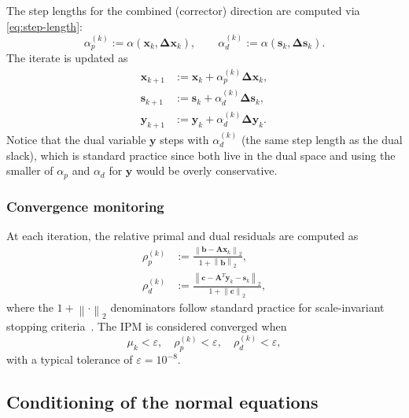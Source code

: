 \documentclass[11pt,twoside]{article}
\newcommand{\bA}{\mathbf{A}}
\newcommand{\bb}{\mathbf{b}}
\newcommand{\bc}{\mathbf{c}}
\newcommand{\bx}{\mathbf{x}}
\newcommand{\by}{\mathbf{y}}
\newcommand{\bs}{\mathbf{s}}
\newcommand{\bDelta}{\mathbf{\Delta}}
\newcommand{\norm}[1]{\left\lVert#1\right\rVert}
\begin{document}
The step lengths for the combined (corrector) direction are computed via
\eqref{eq:step-length}:
\begin{equation}
  \alpha_p^{(k)} := \alpha(\bx_k, \bDelta\bx_k),\qquad
  \alpha_d^{(k)} := \alpha(\bs_k, \bDelta\bs_k).
  \label{eq:step-lengths}
\end{equation}
The iterate is updated as
\begin{equation}
  \begin{aligned}
    \bx_{k+1} &:= \bx_k + \alpha_p^{(k)} \bDelta\bx_k, \\
    \bs_{k+1} &:= \bs_k + \alpha_d^{(k)} \bDelta\bs_k, \\
    \by_{k+1} &:= \by_k + \alpha_d^{(k)} \bDelta\by_k.
  \end{aligned}
  \label{eq:update}
\end{equation}
Notice that the dual variable $\by$ steps with $\alpha_d^{(k)}$ (the same
step length as the dual slack), which is standard practice since both
live in the dual space and using the smaller of $\alpha_p$ and $\alpha_d$
for $\by$ would be overly conservative.

\subsubsection{Convergence monitoring}

At each iteration, the relative primal and dual residuals are computed as
\begin{align}
  \rho_p^{(k)} &:= \frac{\norm{\bb - \bA\bx_k}_2}
                        {1 + \norm{\bb}_2},
    \label{eq:primal-res} \\[4pt]
  \rho_d^{(k)} &:= \frac{\norm{\bc - \bA^T\by_k - \bs_k}_2}
                        {1 + \norm{\bc}_2},
    \label{eq:dual-res}
\end{align}
where the $1 + \norm{\cdot}_2$ denominators follow standard practice for
scale-invariant stopping criteria~\cite{Wright1997}.  The IPM is
considered converged when
\begin{equation}
  \mu_k < \varepsilon,\quad
  \rho_p^{(k)} < \varepsilon,\quad
  \rho_d^{(k)} < \varepsilon,
  \label{eq:ipm-conv-test}
\end{equation}
with a typical tolerance of $\varepsilon = 10^{-8}$.

\subsection{Conditioning of the normal equations}
\end{document}
